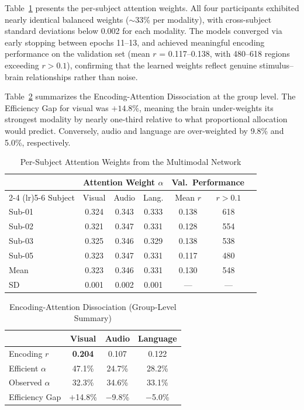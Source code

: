 \documentclass[conference]{IEEEtran}
\begin{document}
Table~\ref{tab:attn_per_subject} presents the per-subject attention weights. All four participants exhibited nearly identical balanced weights ($\sim$33\% per modality), with cross-subject standard deviations below 0.002 for each modality. The models converged via early stopping between epochs 11--13, and achieved meaningful encoding performance on the validation set (mean $r$ = 0.117--0.138, with 480--618 regions exceeding $r > 0.1$), confirming that the learned weights reflect genuine stimulus--brain relationships rather than noise.

Table~\ref{tab:dissociation} summarizes the Encoding-Attention Dissociation at the group level. The Efficiency Gap for visual was $+14.8\%$, meaning the brain under-weights its strongest modality by nearly one-third relative to what proportional allocation would predict. Conversely, audio and language are over-weighted by 9.8\% and 5.0\%, respectively.

\begin{table}[t]
\caption{Per-Subject Attention Weights from the Multimodal Network}
\label{tab:attn_per_subject}
\centering
\begin{tabular*}{\columnwidth}{@{\extracolsep{\fill}}lcccccc@{}}
\toprule
 & \multicolumn{3}{c}{Attention Weight $\alpha$} & \multicolumn{2}{c}{Val.\ Performance} \\
\cmidrule(lr){2-4} \cmidrule(lr){5-6}
Subject & Visual & Audio & Lang. & Mean $r$ & $r\!>\!0.1$ \\
\midrule
Sub-01 & 0.324 & 0.343 & 0.333 & 0.138 & 618 \\
Sub-02 & 0.321 & 0.347 & 0.331 & 0.128 & 554 \\
Sub-03 & 0.325 & 0.346 & 0.329 & 0.138 & 538 \\
Sub-05 & 0.323 & 0.347 & 0.331 & 0.117 & 480 \\
\midrule
Mean & 0.323 & 0.346 & 0.331 & 0.130 & 548 \\
SD & 0.001 & 0.002 & 0.001 & --- & --- \\
\bottomrule
\end{tabular*}
\end{table}

\begin{table}[t]
\caption{Encoding-Attention Dissociation (Group-Level Summary)}
\label{tab:dissociation}
\centering
\setlength{\tabcolsep}{8pt}
\begin{tabular}{lccc}
\toprule
 & Visual & Audio & Language \\
\midrule
Encoding $r$ & \textbf{0.204} & 0.107 & 0.122 \\
Efficient $\alpha$ & 47.1\% & 24.7\% & 28.2\% \\
Observed $\alpha$ & 32.3\% & 34.6\% & 33.1\% \\
Efficiency Gap & $+$14.8\% & $-$9.8\% & $-$5.0\% \\
\bottomrule
\end{tabular}
\end{table}
\end{document}
